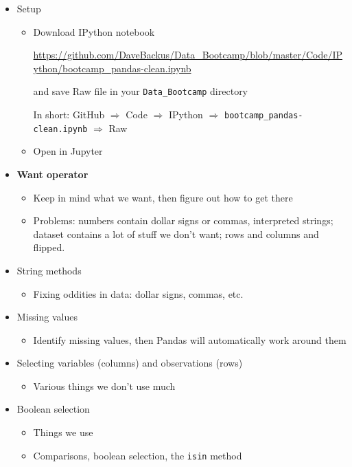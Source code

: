 \documentclass[11pt]{article}
\begin{document}
\begin{itemize}
\item Setup 
\begin{itemize} 
\item Download IPython notebook

\url{https://github.com/DaveBackus/Data_Bootcamp/blob/master/Code/IPython/bootcamp_pandas-clean.ipynb} 

and save Raw file in your \verb|Data_Bootcamp| directory

In short:  GitHub $\Rightarrow$ Code $\Rightarrow$ IPython $\Rightarrow$  
 \verb|bootcamp_pandas-clean.ipynb| $\Rightarrow$ Raw
 
\item Open in Jupyter 
\end{itemize} 

\item {\bf Want operator}
\begin{itemize}
\item Keep in mind what we want, then figure out how to get there
\item Problems:  numbers contain dollar signs or commas, interpreted strings; 
dataset contains a lot of stuff we don't want; rows and columns and flipped.   
\end{itemize}

\item String methods
\begin{itemize}
\item Fixing oddities in data:  dollar signs, commas, etc. 
\end{itemize}

\item Missing values 
\begin{itemize}
\item Identify missing values, then Pandas will automatically work around them 
\end{itemize} 

\item Selecting variables (columns) and observations (rows)
\begin{itemize}
\item Various things we don't use much
\end{itemize}

\item Boolean selection
\begin{itemize}
\item Things we use 
\item Comparisons, boolean selection, the {\tt isin} method
\end{itemize}



\end{itemize} 
\end{document}
